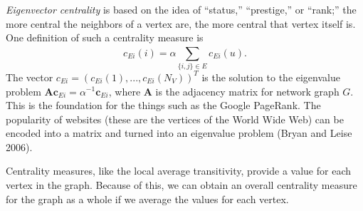 \documentclass[12pt,twoside]{amherstthesis}
\begin{document}
  \emph{Eigenvector centrality} is based on the idea of ``status,''
  ``prestige,'' or ``rank;'' the more central the neighbors of a vertex
  are, the more central that vertex itself is. One definition of such a
  centrality measure is
  \[c_{Ei}(i) = \alpha \sum_{\{i,j\} \in E}^{} c_{Ei} (u).\] The vector
  \(c_{Ei} = (c_{Ei}(1), ..., c_{Ei}(N_V))^T\) is the solution to the
  eigenvalue problem
  \(\textbf{A}\textbf{c}_{Ei} = \alpha^{-1}\textbf{c}_{Ei}\), where
  \(\textbf{A}\) is the adjacency matrix for network graph \(G\). This is
  the foundation for the things such as the Google PageRank. The
  popularity of websites (these are the vertices of the World Wide Web)
  can be encoded into a matrix and turned into an eigenvalue problem
  (Bryan and Leise 2006).
  
  Centrality measures, like the local average transitivity, provide a
  value for each vertex in the graph. Because of this, we can obtain an
  overall centrality measure for the graph as a whole if we average the
  values for each vertex.
  
\end{document}
